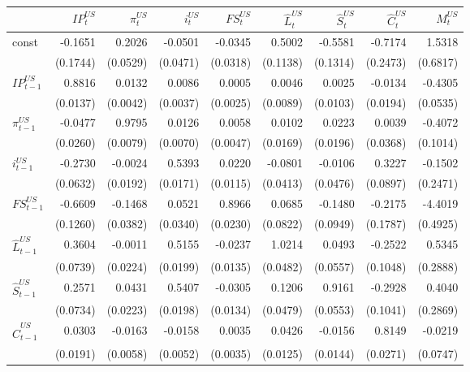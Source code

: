 \begin{sidewaystable}
    \centering
\begin{tabular}{lrrrrrrrr}
        \toprule
        {} &        $IP^{US}_{t}$ &   $\pi^{US}_{t}$ &       $i^{US}_{t}$ &       $FS^{US}_{t}$ &         $\hat{L}^{US}_{t}$ &         $\hat{S}^{US}_{t}$ &         $\hat{C}^{US}_{t}$ &   $M^{US}_{t}$ \\
        \midrule
    const & -0.1651 & 0.2026 & -0.0501 & -0.0345 & 0.5002 & -0.5581 & -0.7174 & 1.5318 \\
     & (0.1744) & (0.0529) & (0.0471) & (0.0318) & (0.1138) & (0.1314) & (0.2473) & (0.6817) \\
    $IP^{US}_{t-1}$ & 0.8816 & 0.0132 & 0.0086 & 0.0005 & 0.0046 & 0.0025 & -0.0134 & -0.4305 \\
     & (0.0137) & (0.0042) & (0.0037) & (0.0025) & (0.0089) & (0.0103) & (0.0194) & (0.0535) \\
    $\pi^{US}_{t-1}$ & -0.0477 & 0.9795 & 0.0126 & 0.0058 & 0.0102 & 0.0223 & 0.0039 & -0.4072 \\
     & (0.0260) & (0.0079) & (0.0070) & (0.0047) & (0.0169) & (0.0196) & (0.0368) & (0.1014) \\
    $i^{US}_{t-1}$ & -0.2730 & -0.0024 & 0.5393 & 0.0220 & -0.0801 & -0.0106 & 0.3227 & -0.1502 \\
     & (0.0632) & (0.0192) & (0.0171) & (0.0115) & (0.0413) & (0.0476) & (0.0897) & (0.2471) \\
    $FS^{US}_{t-1}$ & -0.6609 & -0.1468 & 0.0521 & 0.8966 & 0.0685 & -0.1480 & -0.2175 & -4.4019 \\
     & (0.1260) & (0.0382) & (0.0340) & (0.0230) & (0.0822) & (0.0949) & (0.1787) & (0.4925) \\
    $\hat{L}^{US}_{t-1}$ & 0.3604 & -0.0011 & 0.5155 & -0.0237 & 1.0214 & 0.0493 & -0.2522 & 0.5345 \\
     & (0.0739) & (0.0224) & (0.0199) & (0.0135) & (0.0482) & (0.0557) & (0.1048) & (0.2888) \\
    $\hat{S}^{US}_{t-1}$ & 0.2571 & 0.0431 & 0.5407 & -0.0305 & 0.1206 & 0.9161 & -0.2928 & 0.4040 \\
     & (0.0734) & (0.0223) & (0.0198) & (0.0134) & (0.0479) & (0.0553) & (0.1041) & (0.2869) \\
    $\hat{C}^{US}_{t-1}$ & 0.0303 & -0.0163 & -0.0158 & 0.0035 & 0.0426 & -0.0156 & 0.8149 & -0.0219 \\
     & (0.0191) & (0.0058) & (0.0052) & (0.0035) & (0.0125) & (0.0144) & (0.0271) & (0.0747) \\

\end{tabular}
\end{sidewaystable}
